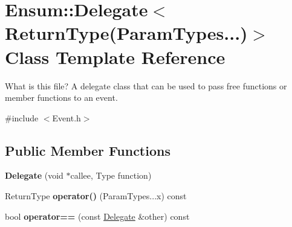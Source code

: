 \hypertarget{class_ensum_1_1_delegate_3_01_return_type_07_param_types_8_8_8_08_4}{}\section{Ensum\+:\+:Delegate$<$ Return\+Type(Param\+Types...)$>$ Class Template Reference}
\label{class_ensum_1_1_delegate_3_01_return_type_07_param_types_8_8_8_08_4}


What is this file? A delegate class that can be used to pass free functions or member functions to an event.  




{\ttfamily \#include $<$Event.\+h$>$}

\subsection*{Public Member Functions}
\begin{DoxyCompactItemize}
\item 
{\bfseries Delegate} (void $\ast$callee, Type function)\hypertarget{class_ensum_1_1_delegate_3_01_return_type_07_param_types_8_8_8_08_4_a14209a13cac7a23f8c2a1aec5fff1534}{}\label{class_ensum_1_1_delegate_3_01_return_type_07_param_types_8_8_8_08_4_a14209a13cac7a23f8c2a1aec5fff1534}

\item 
Return\+Type {\bfseries operator()} (Param\+Types...\+x) const \hypertarget{class_ensum_1_1_delegate_3_01_return_type_07_param_types_8_8_8_08_4_ab92a4899a8fa0166e3c5d6888ebd2413}{}\label{class_ensum_1_1_delegate_3_01_return_type_07_param_types_8_8_8_08_4_ab92a4899a8fa0166e3c5d6888ebd2413}

\item 
bool {\bfseries operator==} (const \hyperlink{class_ensum_1_1_delegate}{Delegate} \&other) const \hypertarget{class_ensum_1_1_delegate_3_01_return_type_07_param_types_8_8_8_08_4_a164df402bddec2eea14b2fb47c121de9}{}\label{class_ensum_1_1_delegate_3_01_return_type_07_param_types_8_8_8_08_4_a164df402bddec2eea14b2fb47c121de9}

\end{DoxyCompactItemize}

